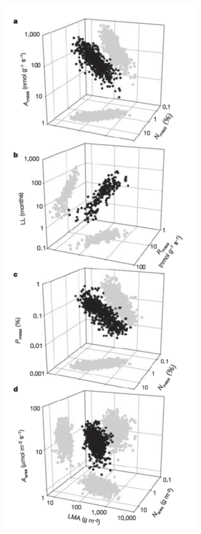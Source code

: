 \documentclass[12pt,oneside]{book}
\begin{document}
\begin{figure}

{\centering \includegraphics[width=0.8\linewidth]{figures/chap7/f75_LES_wright} 

}
\end{figure}
\end{document}
